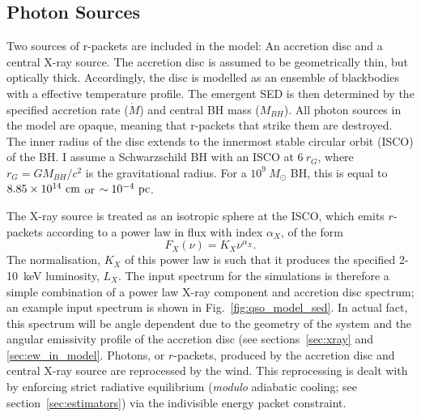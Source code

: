 \subsection{Photon Sources}
\label{sec:photon_sources}

Two sources of r-packets are included in the model:
An accretion disc and a central X-ray source.
The accretion disc is assumed to be geometrically thin, 
but optically thick.
Accordingly, the disc is modelled as an ensemble of blackbodies with a 
\cite{shakurasunyaev1973} effective temperature profile. 
The emergent SED is then determined by the specified accretion rate ($\dot{M}$)
and central BH mass ($M_{BH}$).
All photon sources in the model are opaque, meaning
that r-packets that strike them are destroyed.
The inner radius of the disc extends to the innermost 
stable circular orbit (ISCO) of the BH. 
I assume a Schwarzschild BH with an ISCO at $6~r_G$, where 
$r_G = GM_{BH}/c^2$ is the gravitational radius.
For a $10^9~M_\odot$ BH, this is equal to $8.85\times10^{14}~{\rm cm}$ 
or $\sim10^{-4}~{\rm pc}$. 


The X-ray source is treated as an isotropic sphere at the ISCO,
which emits $r$-packets according to a power law in flux with index $\alpha_X$, of the form
\begin{equation}
F_X (\nu) = K_X \nu^{\alpha_X}.
\end{equation}
The normalisation, $K_X$ of this power law is such that it 
produces the specified 2-10~keV luminosity, $L_X$.
The input spectrum for the simulations is therefore a simple combination
of a power law X-ray component and accretion disc spectrum; an example input
spectrum is shown in Fig.~\ref{fig:qso_model_sed}. In actual fact, this
spectrum will be angle dependent due to the geometry of the system and 
the angular emissivity profile of the accretion disc (see sections~\ref{sec:xray}
and \ref{sec:ew_in_model}.
Photons, or $r$-packets, produced by the accretion disc and central X-ray source
are reprocessed by the wind. This reprocessing is dealt with by enforcing strict
radiative equilibrium ({\em modulo} adiabatic cooling; see section~\ref{sec:estimators})
via the indivisible energy packet constraint.  

